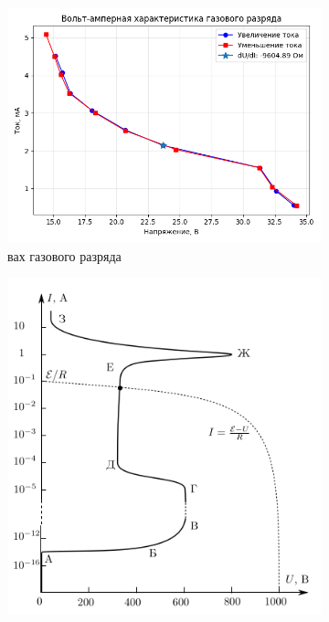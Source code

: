 \documentclass[a4paper, 12pt]{article}
\begin{document}
\begin{enumerate}
    \begin{figure}[htbp]
    \centering
    \begin{subfigure}{0.5\textwidth}
            \includegraphics[width=\linewidth]{vax.png}
            \caption{вах газового разряда}
            \label{вах газового разряда}
        \end{subfigure}
        \begin{subfigure}{0.45\textwidth}
            \includegraphics[width=\linewidth]{current.png}

\end{subfigure}
\end{figure}
\end{enumerate}
\end{document}
